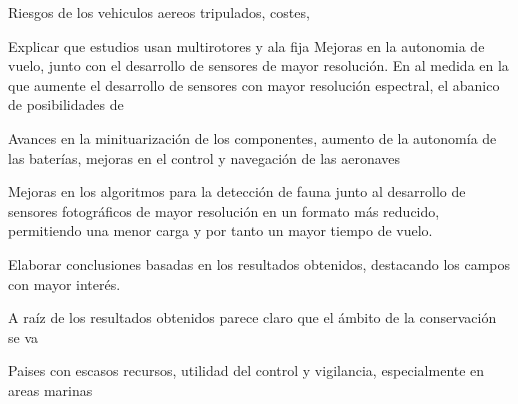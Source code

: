\documentclass[11pt,]{article}
\begin{document}
Riesgos de los vehiculos aereos tripulados, costes,

Explicar que estudios usan multirotores y ala fija Mejoras en la
autonomia de vuelo, junto con el desarrollo de sensores de mayor
resolución. En al medida en la que aumente el desarrollo de sensores con
mayor resolución espectral, el abanico de posibilidades de

Avances en la minituarización de los componentes, aumento de la
autonomía de las baterías, mejoras en el control y navegación de las
aeronaves

Mejoras en los algoritmos para la detección de fauna junto al desarrollo
de sensores fotográficos de mayor resolución en un formato más reducido,
permitiendo una menor carga y por tanto un mayor tiempo de vuelo.

Elaborar conclusiones basadas en los resultados obtenidos, destacando
los campos con mayor interés.

A raíz de los resultados obtenidos parece claro que el ámbito de la
conservación se va

Paises con escasos recursos, utilidad del control y vigilancia,
especialmente en areas marinas

\newpage
\singlespacing 

\end{document}
